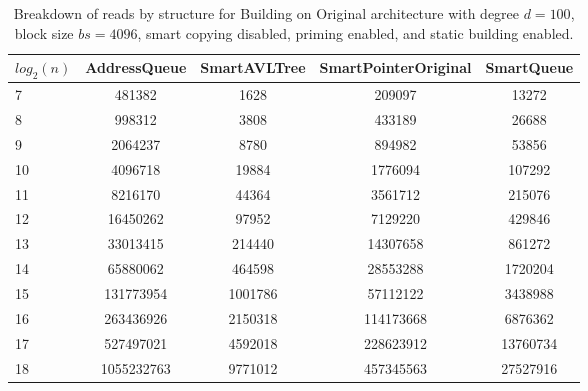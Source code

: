 \begin{table}[]
\centering
\begin{tabular}{|l|c|c|c|c|}
$log_2(n)$ & AddressQueue & SmartAVLTree & SmartPointerOriginal & SmartQueue \\ \hline
7 & 481382 & 1628 & 209097 & 13272 \\ \hline
8 & 998312 & 3808 & 433189 & 26688 \\ \hline
9 & 2064237 & 8780 & 894982 & 53856 \\ \hline
10 & 4096718 & 19884 & 1776094 & 107292 \\ \hline
11 & 8216170 & 44364 & 3561712 & 215076 \\ \hline
12 & 16450262 & 97952 & 7129220 & 429846 \\ \hline
13 & 33013415 & 214440 & 14307658 & 861272 \\ \hline
14 & 65880062 & 464598 & 28553288 & 1720204 \\ \hline
15 & 131773954 & 1001786 & 57112122 & 3438988 \\ \hline
16 & 263436926 & 2150318 & 114173668 & 6876362 \\ \hline
17 & 527497021 & 4592018 & 228623912 & 13760734 \\ \hline
18 & 1055232763 & 9771012 & 457345563 & 27527916 \\ \hline
\end{tabular}
\caption{Breakdown of reads by structure for Building on Original architecture with degree $d=100$, block size $bs=4096$, smart copying disabled, priming enabled, and static building enabled.}
    \label{tab:reads_by_structure_build_d100_bs4096_copiesfalse_primetrue_staticinsertiontrue_ptoriginal_movefalse}
\end{table}

